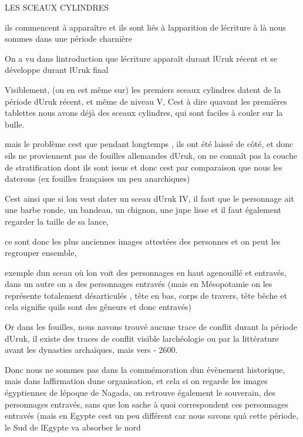 \documentclass{article}
\begin{document}
LES SCEAUX CYLINDRES

ils commencent à apparaître et ils sont liés à
l{\textquotesingle}apparition de l{\textquotesingle}écriture à là nous
sommes dans une période charnière

On a vu dans l{\textquotesingle}introduction que
l{\textquotesingle}écriture apparaît durant l{\textquotesingle}Uruk
récent et se développe durant l{\textquotesingle}Uruk final

Visiblement, (on en est même sur) les premiers sceaux cylindres datent
de la période d{\textquotesingle}Uruk récent, et même de niveau V,
C{\textquotesingle}est à dire qu{\textquotesingle}avant les premières
tablettes nous avons déjà des sceaux cylindres, qui sont faciles à
couler sur la bulle.

mais le problème c{\textquotesingle}est que pendant longtemps , ils ont
été laissé de côté, et donc s{\textquotesingle}ils ne proviennent pas
de fouilles allemandes d{\textquotesingle}Uruk, on ne connaît pas la
couche de stratification dont ils sont issus et donc
c{\textquotesingle}est par comparaison que nous les daterons (ex
fouilles françaises un peu anarchiques)

C{\textquotesingle}est ainsi que si l{\textquotesingle}on veut dater un
sceau d{\textquotesingle}Uruk IV, il faut que le personnage ait une
barbe ronde, un bandeau, un chignon, une jupe lisse et il faut
également regarder la taille de sa lance, 

ce sont donc les plus anciennes images attestées des personnes et on
peut les regrouper ensemble, 

exemple d{\textquotesingle}un sceau où  l{\textquotesingle}on voit des
personnages en haut agenouillé et entravés, dans un autre on a des
personnages entravés (mais en Mésopotamie on les représente totalement
désarticulés , tête en bas, corps de travers,  tête bêche et cela
signifie qu{\textquotesingle}ils sont des gêneurs et donc entravés)

Or dans les fouilles, nous n{\textquotesingle}avons trouvé aucune trace
de conflit durant la période d{\textquotesingle}Uruk, il existe des
traces de conflit visible l{\textquotesingle}archéologie ou par la
littérature avant les dynasties archaïques, mais vers - 2600.

\newline
Donc nous ne sommes pas dans la commémoration d{\textquotesingle}un
évènement historique, mais dans l{\textquotesingle}affirmation 
d{\textquotesingle}une organisation, et cela si on regarde les images
égyptiennes de l{\textquotesingle}époque de Nagada, on retrouve
également le souverain, des personnages entravés, sans que
l{\textquotesingle}on sache à quoi correspondent ces personnages
entravés (mais en Egypte c{\textquotesingle}est un peu différent car
nous savons qu{\textquotesingle}à cette période, le Sud de
l{\textquotesingle}Egypte va absorber le nord
\end{document}
